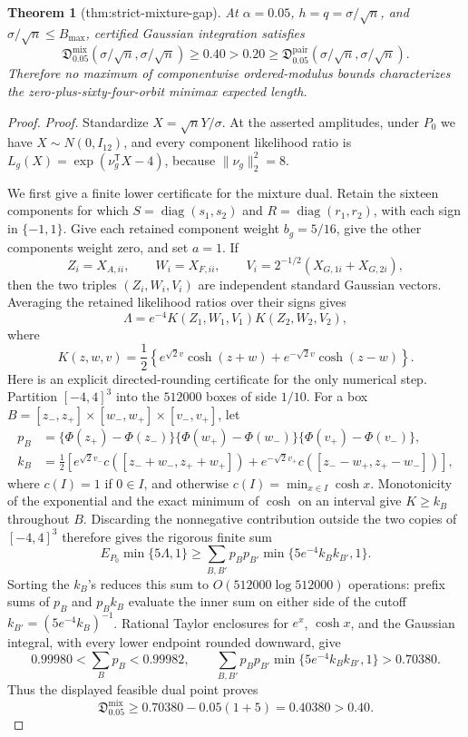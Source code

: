 \documentclass{article}
\newtheorem{theorem}{Theorem}
\begin{document}
\begin{theorem}[thm:strict-mixture-gap]\label{thm:strict-mixture-gap}
At \(\alpha=0.05\), \(h=q=\sigma/\sqrt n\), and \(\sigma/\sqrt n\le B_{\max}\), certified Gaussian integration satisfies \[\mathfrak D_{0.05}^{\mathrm{mix}}(\sigma/\sqrt n,\sigma/\sqrt n)\ge0.40>0.20\ge\mathfrak D_{0.05}^{\mathrm{pair}}(\sigma/\sqrt n,\sigma/\sqrt n).\] Therefore no maximum of componentwise ordered-modulus bounds characterizes the zero-plus-sixty-four-orbit minimax expected length.
\end{theorem}
\begin{proof}
\textit{Proof.}
Standardize \(X=\sqrt nY/\sigma\).  At the asserted amplitudes, under \(P_0\)
we have \(X\sim N(0,I_{12})\), and every component likelihood ratio is
\(L_g(X)=\exp(\nu_g^{\mathsf T}X-4)\), because
\(\lVert\nu_g\rVert_2^2=8\).

We first give a finite lower certificate for the mixture dual.  Retain the
sixteen components for which
\(S=\operatorname{diag}(s_1,s_2)\) and
\(R=\operatorname{diag}(r_1,r_2)\), with each sign in \(\{-1,1\}\).  Give
each retained component weight \(b_g=5/16\), give the other components weight
zero, and set \(a=1\).  If
\[
Z_i=X_{A,ii},\qquad W_i=X_{F,ii},\qquad
V_i=2^{-1/2}(X_{G,1i}+X_{G,2i}),
\]
then the two triples \((Z_i,W_i,V_i)\) are independent standard Gaussian
vectors.  Averaging the retained likelihood ratios over their signs gives
\[
\Lambda=e^{-4}K(Z_1,W_1,V_1)K(Z_2,W_2,V_2),
\]
where
\[
K(z,w,v)=\frac12\left\{e^{\sqrt2v}\cosh(z+w)
+e^{-\sqrt2v}\cosh(z-w)\right\}.
\]
Here is an explicit directed-rounding certificate for the only numerical
step.  Partition \([-4,4]^3\) into the \(512000\) boxes of side \(1/10\).
For a box
\(B=[z_-,z_+]\times[w_-,w_+]\times[v_-,v_+]\), let
\[
\begin{split}
p_B&=\{\Phi(z_+)-\Phi(z_-)\}
     \{\Phi(w_+)-\Phi(w_-)\}
     \{\Phi(v_+)-\Phi(v_-)\},\\
k_B&=\frac12\left[e^{\sqrt2v_-}c([z_-+w_-,z_++w_+])
+e^{-\sqrt2v_+}c([z_--w_+,z_+-w_-])\right],
\end{split}
\]
where \(c(I)=1\) if \(0\in I\), and otherwise
\(c(I)=\min_{x\in I}\cosh x\).  Monotonicity of the exponential and the exact
minimum of \(\cosh\) on an interval give \(K\geq k_B\) throughout \(B\).
Discarding the nonnegative contribution outside the two copies of
\([-4,4]^3\) therefore gives the rigorous finite sum
\[
E_{P_0}\min\{5\Lambda,1\}
\geq \sum_{B,B'}p_Bp_{B'}
\min\{5e^{-4}k_Bk_{B'},1\}.
\]
Sorting the \(k_B\)'s reduces this sum to \(O(512000\log 512000)\) operations:
prefix sums of \(p_B\) and \(p_Bk_B\) evaluate the inner sum on either side of
the cutoff \(k_{B'}=(5e^{-4}k_B)^{-1}\).  Rational Taylor enclosures for
\(e^x\), \(\cosh x\), and the Gaussian integral, with every lower endpoint
rounded downward, give
\[
0.99980<\sum_Bp_B<0.99982,
\qquad
\sum_{B,B'}p_Bp_{B'}\min\{5e^{-4}k_Bk_{B'},1\}>0.70380.
\]
Thus the displayed feasible dual point proves
\[
\mathfrak D_{0.05}^{\mathrm{mix}}
\geq0.70380-0.05(1+5)=0.40380>0.40.
\]


\end{proof}
\end{document}
